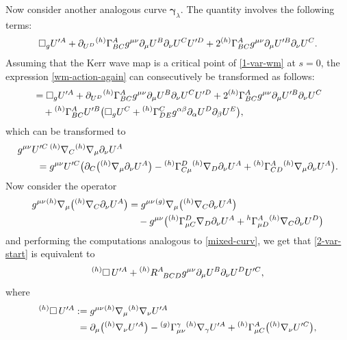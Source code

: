 \documentclass[11pt]{article}
\numberwithin{equation}{section}
\def\ptl{\partial}%
\def\mbo#1{\boldsymbol{#1}}%
\def\grad{{\nabla}}%
\newcommand{\leftexp}[2]{{\vphantom{#2}}^{#1}{#2}}
\def \a{\alpha}
\def \b {\beta}
\renewcommand{\a}{\alpha}
\renewcommand{\b}{\beta}
\numberwithin{equation}{section}
\begin{document}
Now consider another analogous curve $\mbo{\gamma}_\lambda$. The quantity \smash{$D^2_{\mbo{\gamma}_\lambda \mbo{\gamma}_s} \cdot L_{{\rm WM}} $}
involves the following terms:
\begin{align}\label{2-var-start}
\square_g U'^{A} + \ptl_{U^D} \leftexp{(h)}{\Gamma}^A_{B C} g^{\mu \nu} \ptl_\mu U^B \ptl_\nu U^C U'^D + 2 \leftexp{(h)}{\Gamma}^A_{BC} g^{\mu \nu} \ptl_\mu U'^B \ptl_\nu U^C.
\end{align}
Assuming that the Kerr wave map is a critical point of \eqref{1-var-wm} at $s=0$, the expression \eqref{wm-action-again} can consecutively be transformed as follows:
\begin{align*}
&{}= \square_g U'^{A} + \ptl_{U^D} \leftexp{(h)}{\Gamma}^A_{B C} g^{\mu \nu} \ptl_\mu U^B \ptl_\nu U^C U'^D + 2 \leftexp{(h)}{\Gamma}^A_{BC} g^{\mu \nu} \ptl_\mu U'^B \ptl_\nu U^C \notag\\
&\quad{} + \leftexp{(h)}{\Gamma}^{A}_{BC} U'^B \bigl(\square_g U^C + \leftexp{(h)}{\Gamma}^{C}_{DE} g^{\a\b} \ptl_\a U^D \ptl_\b U^E\bigr),
\end{align*}
which can be transformed to
\begin{align*} %
&g^{\mu \nu} U'^C \, \leftexp{(h)}{\grad}_C \leftexp{(h)}{\grad}_\mu \ptl_\nu U^A \notag\\
&\qquad= g^{\mu \nu} U'^C \bigl(\ptl_C \bigl(\leftexp{(h)}{\grad}_\mu \ptl_\nu U^A\bigr) - \leftexp{(h)}{\Gamma}^D_{C \mu} \leftexp{(h)}{\grad}_D \ptl_\nu U^A + \leftexp{(h)}{\Gamma}^{A}_{CD} \leftexp{(h)}{\grad}_\mu \ptl_\nu U^A \bigr).
\end{align*}
Now consider the operator
\begin{align*} %
g^{\mu\nu}\leftexp{(h)}{\grad}_\mu \bigl(\leftexp{(h)}{\grad}_C \ptl_\nu U^A\bigr) &{}= g^{\mu \nu} \leftexp{(g)}{\grad}_\mu \bigl(\leftexp{(h)}{\grad}_C \ptl_\nu U^A\bigr) \notag\\
&\quad{} - g^{\mu \nu} \bigl(\leftexp{(h)}{\Gamma}^D_{\mu C} \grad_D \ptl_\nu U^A + \leftexp{h}{\Gamma}^A_{\mu D} \leftexp{(h)}{\grad}_C \ptl_\nu U^D \bigr)
\end{align*}
and performing the computations analogous to \eqref{mixed-curv}, we get that \eqref{2-var-start} is equivalent to
\begin{align*}
\leftexp{(h)}{\square}\, U'^A + \leftexp{(h)}{R}^A_{\,\,\,\,BCD} g^{\mu \nu} \ptl_\mu U^B \ptl_\nu U^D U'^C,
\end{align*}
where
\begin{align*}
\leftexp{(h)}{\square} \, U'^A :={}& g^{\mu \nu} \leftexp{(h)}{\grad}_\mu \leftexp{(h)}{\grad}_\nu U'^A \notag\\
 ={}& \ptl_\mu \bigl(\leftexp{(h)}{\grad}_\nu U'^A\bigr) - \leftexp{(g)}{\Gamma}^{\gamma}_{\mu \nu} \leftexp{(h)}{\grad}_\gamma U'^A + \leftexp{(h)}{\Gamma}^A_{\mu C} \bigl(\leftexp{(h)}{\grad}_\nu U'^C\bigr),
 \end{align*}
\end{document}
